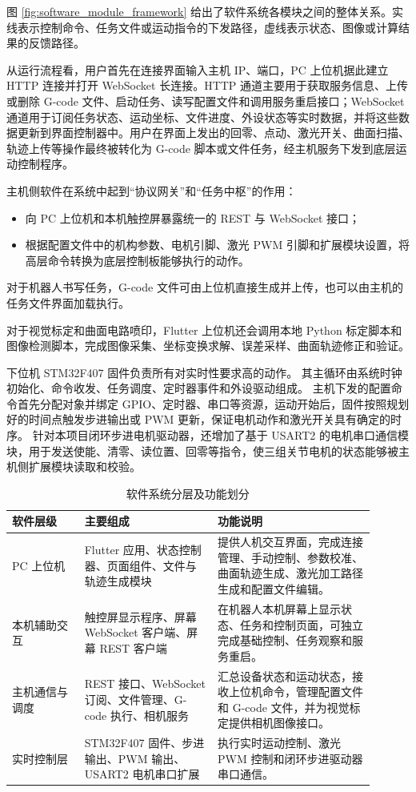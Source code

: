 ﻿\documentclass[UTF8,zihao=-4,fontset=windows]{ctexart}
\begin{document}
图 \ref{fig:software_module_framework} 给出了软件系统各模块之间的整体关系。实线表示控制命令、任务文件或运动指令的下发路径，虚线表示状态、图像或计算结果的反馈路径。

从运行流程看，用户首先在连接界面输入主机 IP、端口，PC 上位机据此建立 HTTP 连接并打开 WebSocket 长连接。HTTP 通道主要用于获取服务信息、上传或删除 G-code 文件、启动任务、读写配置文件和调用服务重启接口；WebSocket 通道用于订阅任务状态、运动坐标、文件进度、外设状态等实时数据，并将这些数据更新到界面控制器中。用户在界面上发出的回零、点动、激光开关、曲面扫描、轨迹上传等操作最终被转化为 G-code 脚本或文件任务，经主机服务下发到底层运动控制程序。

主机侧软件在系统中起到“协议网关”和“任务中枢”的作用：
\begin{itemize}
  \item 向 PC 上位机和本机触控屏暴露统一的 REST 与 WebSocket 接口；
  \item 根据配置文件中的机构参数、电机引脚、激光 PWM 引脚和扩展模块设置，将高层命令转换为底层控制板能够执行的动作。
\end{itemize}

对于机器人书写任务，G-code 文件可由上位机直接生成并上传，也可以由主机的任务文件界面加载执行。

对于视觉标定和曲面电路喷印，Flutter 上位机还会调用本地 Python 标定脚本和图像检测脚本，完成图像采集、坐标变换求解、误差采样、曲面轨迹修正和验证。

下位机 STM32F407 固件负责所有对实时性要求高的动作。
其主循环由系统时钟初始化、命令收发、任务调度、定时器事件和外设驱动组成。
主机下发的配置命令首先分配对象并绑定 GPIO、定时器、串口等资源，运动开始后，固件按照规划好的时间点触发步进输出或 PWM 更新，保证电机动作和激光开关具有确定的时序。
针对本项目闭环步进电机驱动器，还增加了基于 USART2 的电机串口通信模块，用于发送使能、清零、读位置、回零等指令，使三组关节电机的状态能够被主机侧扩展模块读取和校验。

\begin{table}[htbp]
  \centering
  \small
  \renewcommand{\arraystretch}{1.25}
  \begin{tabular}{|p{0.18\linewidth}|p{0.33\linewidth}|p{0.39\linewidth}|}
    \hline
    软件层级 & 主要组成 & 功能说明 \\
    \hline
    PC 上位机 & Flutter 应用、状态控制器、页面组件、文件与轨迹生成模块 & 提供人机交互界面，完成连接管理、手动控制、参数校准、曲面轨迹生成、激光加工路径生成和配置文件编辑。 \\
    \hline
    本机辅助交互 & 触控屏显示程序、屏幕 WebSocket 客户端、屏幕 REST 客户端 & 在机器人本机屏幕上显示状态、任务和控制页面，可独立完成基础控制、任务观察和服务重启。 \\
    \hline
    主机通信与调度 & REST 接口、WebSocket 订阅、文件管理、G-code 执行、相机服务 & 汇总设备状态和运动状态，接收上位机命令，管理配置文件和 G-code 文件，并为视觉标定提供相机图像接口。 \\
    \hline
    实时控制层 & STM32F407 固件、步进输出、PWM 输出、USART2 电机串口扩展 & 执行实时运动控制、激光 PWM 控制和闭环步进驱动器串口通信。 \\
    \hline
  \end{tabular}
  \caption{软件系统分层及功能划分}
  \label{tab:software_layers}
\end{table}
\end{document}
